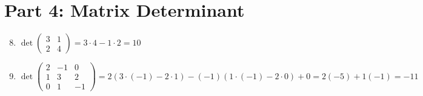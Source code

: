 \documentclass{article}
\begin{document}
\section*{Part 4: Matrix Determinant}
\begin{enumerate}
	\setcounter{enumi}{7}
	\item $\det\begin{pmatrix} 3 & 1 \\ 2 & 4 \end{pmatrix} = \boxed{3\cdot4 - 1\cdot2 = 10}$
	
	\item $\det\begin{pmatrix} 2 & -1 & 0 \\ 1 & 3 & 2 \\ 0 & 1 & -1 \end{pmatrix} = \boxed{2(3\cdot(-1)-2\cdot1) - (-1)(1\cdot(-1)-2\cdot0) + 0 = 2(-5) + 1(-1) = -11}$
\end{enumerate}

\newpage
\end{document}
